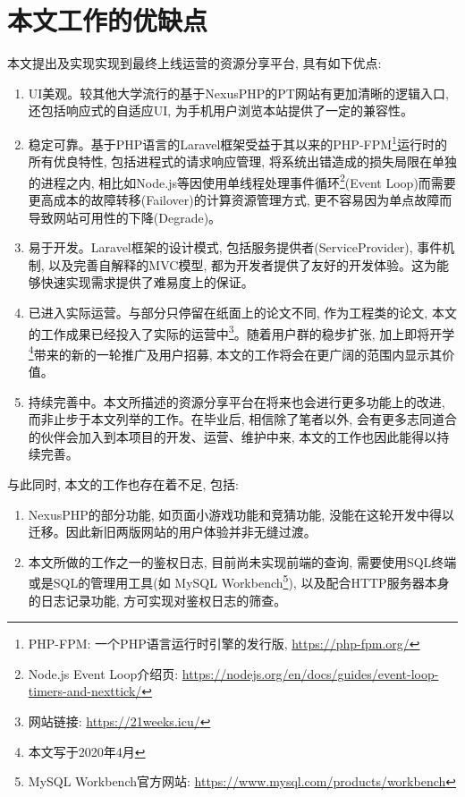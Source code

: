 \section{本文工作的优缺点}

本文提出及实现实现到最终上线运营的资源分享平台, 具有如下优点:

\begin{enumerate}[label=(\arabic*),leftmargin=*]
\item UI美观。较其他大学流行的基于NexusPHP的PT网站有更加清晰的逻辑入口, 还包括响应式的自适应UI, 为手机用户浏览本站提供了一定的兼容性。

\item 稳定可靠。基于PHP语言的Laravel框架受益于其以来的PHP-FPM\footnote{PHP-FPM: 一个PHP语言运行时引擎的发行版, \url{https://php-fpm.org/}}运行时的所有优良特性, 包括进程式的请求响应管理, 将系统出错造成的损失局限在单独的进程之内, 相比如Node.js等因使用单线程处理事件循环\footnote{Node.js Event Loop介绍页: \url{https://nodejs.org/en/docs/guides/event-loop-timers-and-nexttick/}}(Event Loop)而需要更高成本的故障转移(Failover)的计算资源管理方式, 更不容易因为单点故障而导致网站可用性的下降(Degrade)。

\item 易于开发。Laravel框架的设计模式, 包括服务提供者(ServiceProvider), 事件机制, 以及完善自解释的MVC模型, 都为开发者提供了友好的开发体验。这为能够快速实现需求提供了难易度上的保证。

\item 已进入实际运营。与部分只停留在纸面上的论文不同, 作为工程类的论文, 本文的工作成果已经投入了实际的运营中\footnote{网站链接: \url{https://21weeks.icu/}}。随着用户群的稳步扩张, 加上即将开学\footnote{本文写于2020年4月}带来的新的一轮推广及用户招募, 本文的工作将会在更广阔的范围内显示其价值。

\item 持续完善中。本文所描述的资源分享平台在将来也会进行更多功能上的改进, 而非止步于本文列举的工作。在毕业后, 相信除了笔者以外, 会有更多志同道合的伙伴会加入到本项目的开发、运营、维护中来, 本文的工作也因此能得以持续完善。
\end{enumerate}


与此同时, 本文的工作也存在着不足, 包括:
\begin{enumerate}[label=(\arabic*),leftmargin=*]
\item NexusPHP的部分功能, 如页面小游戏功能和竞猜功能, 没能在这轮开发中得以迁移。因此新旧两版网站的用户体验并非无缝过渡。

\item 本文所做的工作之一的鉴权日志, 目前尚未实现前端的查询, 需要使用SQL终端或是SQL的管理用工具(如 MySQL Workbench\footnote{MySQL Workbench官方网站: \url{https://www.mysql.com/products/workbench}}), 以及配合HTTP服务器本身的日志记录功能, 方可实现对鉴权日志的筛查。
\end{enumerate}

